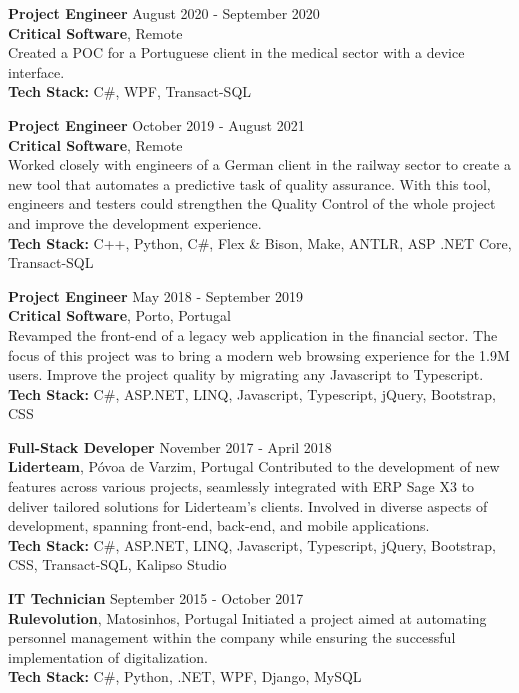 \documentclass[margin, 10pt]{res} %
\begin{document}
\begin{resume}
    \textbf{Project Engineer} \hfill August 2020 - September 2020\\
    \textbf{Critical Software}, Remote\\
    Created a POC for a Portuguese client in the medical sector with a device interface.\\
    \textbf {Tech Stack:} C\#, WPF, Transact-SQL


    \textbf{Project Engineer} \hfill October 2019 - August 2021\\
    \textbf{Critical Software}, Remote\\
    Worked closely with engineers of a German client in the railway sector to create a new tool that automates a predictive task of quality assurance. With this tool, engineers and testers could strengthen the Quality Control of the whole project and improve the development experience.\\  
    \textbf {Tech Stack:} C++, Python, C\#, Flex \& Bison, Make, ANTLR, ASP .NET Core, Transact-SQL


    \textbf{Project Engineer} \hfill May 2018 - September 2019\\
    \textbf{Critical Software}, Porto, Portugal\\
    Revamped the front-end of a legacy web application in the financial sector. The focus of this project was to bring a modern web browsing experience for the 1.9M users. Improve the project quality by migrating any Javascript to Typescript.\\
    \textbf {Tech Stack:} C\#, ASP.NET, LINQ, Javascript, Typescript, jQuery, Bootstrap, CSS

    
    \textbf{Full-Stack Developer} \hfill November 2017 - April 2018\\
    \textbf{Liderteam}, Póvoa de Varzim, Portugal
    Contributed to the development of new features across various projects, seamlessly integrated with ERP Sage X3 to deliver tailored solutions for Liderteam's clients. Involved in diverse aspects of development, spanning front-end, back-end, and mobile applications.\\
    \textbf {Tech Stack:} C\#, ASP.NET, LINQ, Javascript, Typescript, jQuery, Bootstrap, CSS, Transact-SQL, Kalipso Studio

    
    \textbf{IT Technician} \hfill September 2015 - October 2017\\
    \textbf{Rulevolution}, Matosinhos, Portugal
    Initiated a project aimed at automating personnel management within the company while ensuring the successful implementation of digitalization.\\
    \textbf {Tech Stack:} C\#, Python, .NET, WPF, Django, MySQL



\end{resume}
\end{document}
